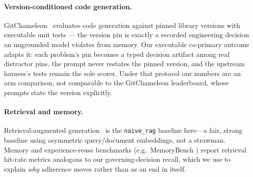 \paragraph{Version-conditioned code generation.}
GitChameleon~\citep{gitchameleon} evaluates code generation against pinned
library versions with executable unit tests --- the version pin is exactly a
recorded engineering decision an ungrounded model violates from memory. Our
executable co-primary outcome adapts it: each problem's pin becomes a typed
decision artifact among real distractor pins, the prompt never restates the
pinned version, and the upstream harness's tests remain the sole scorer. Under
that protocol our numbers are an arm comparison, not comparable to the
GitChameleon leaderboard, whose prompts state the version explicitly.

\paragraph{Retrieval and memory.}
Retrieval-augmented generation~\citep{rag} is the \texttt{naive\_rag} baseline
here---a fair, strong baseline using asymmetric query/document embeddings, not a
strawman. Memory and experience-reuse benchmarks (e.g.\ MemoryBench
\citep{memorybench}) report retrieval hit-rate metrics analogous to our
governing-decision recall, which we use to explain \emph{why} adherence moves
rather than as an end in itself.
